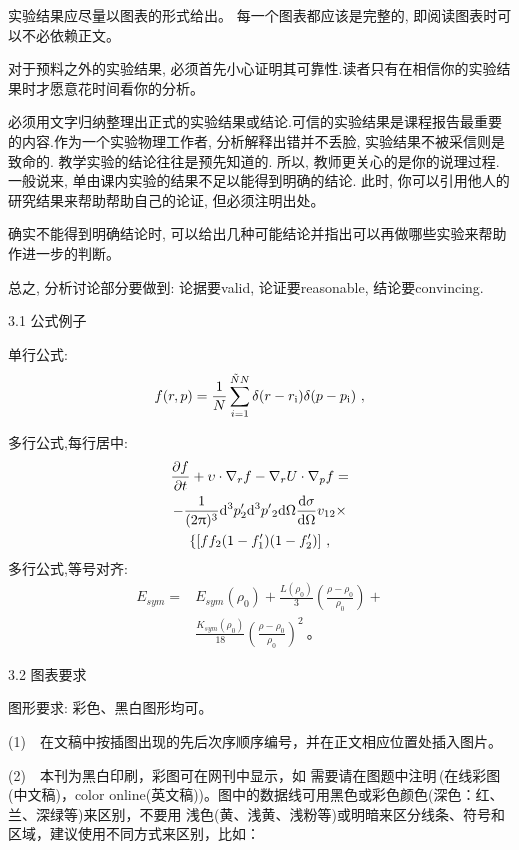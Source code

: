 \documentclass[a4paper,10.0pt,twoside]{npr}
\begin{document}
\begin{multicols}{2}
实验结果应尽量以图表的形式给出。 每一个图表都应该是完整的, 即阅读图表时可以不必依赖正文。

对于预料之外的实验结果, 必须首先小心证明其可靠性.读者只有在相信你的实验结果时才愿意花时间看你的分析。

必须用文字归纳整理出正式的实验结果或结论.可信的实验结果是课程报告最重要的内容.作为一个实验物理工作者, 分析解释出错并不丢脸, 实验结果不被采信则是致命的.
教学实验的结论往往是预先知道的. 所以, 教师更关心的是你的说理过程. 一般说来, 单由课内实验的结果不足以能得到明确的结论. 此时, 你可以引用他人的研究结果来帮助帮助自己的论证, 但必须注明出处。

确实不能得到明确结论时, 可以给出几种可能结论并指出可以再做哪些实验来帮助作进一步的判断。

总之, 分析讨论部分要做到: 论据要valid, 论证要reasonable, 结论要convincing.


3.1 公式例子

单行公式:
\begin{equation}
f(r,p)=\frac{1}{N}\sum_{i=1}^{\tilde{N}N}\delta(r-r_{\RM{i}})\delta(p-p_{\RM{i}}) ~,%
\end{equation}

多行公式,每行居中:
\begin{gather}  %
\frac{\partial f}{\partial t}+\upsilon \cdot {{\nabla }_{r}}f-{{\nabla }_{r}}U\cdot {{\nabla }_{p}}f=\nonumber\\
 -\frac{1}{(2\uppi )^3}{\RM{d}^3}p'_{2}\RM{d}^{3}p{'}_{2}\RM{d}
 \Omega \frac{\RM{d}\sigma }{\RM{d}\Omega }v_{12}\times \nonumber\\
\{[f\/f_{2}(1-f'_{1})(1-f'_{2})]~,  %
\end{gather}
多行公式,等号对齐:
\begin{align}  %
E_{sym}=&E_{sym}(\rho_0)+\frac{L(\rho_0)}{3}\left(\frac{\rho-\rho_0}{\rho_0}\right)+ \nonumber \\
& \frac{K_{sym}(\rho_0)}{18}\left(\frac{\rho-\rho_0}{\rho_0}\right)^2~\text{。}
\end{align}

3.2 图表要求

图形要求:  彩色、黑白图形均可。

(1)~~在文稿中按插图出现的先后次序顺序编号，并在正文相应位置处插入图片。

(2)~~本刊为黑白印刷，彩图可在网刊中显示，如
需要请在图题中注明\,(在线彩图(中文稿)，color online(英文稿))。图中的数据线可用黑色或彩色颜色(深色：红、兰、深绿等)来区别，不要用
浅色(黄、浅黄、浅粉等)或明暗来区分线条、符号和区域，建议使用不同方式来区别，比如：


\end{multicols}
\end{document}
